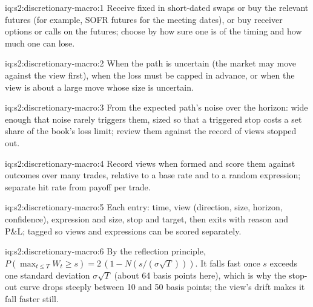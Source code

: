 \begin{solution}{iq:s2:discretionary-macro:1}
Receive fixed in short-dated swaps or buy the relevant futures (for example, SOFR futures for the meeting dates), or buy receiver options or calls on
the futures; choose by how sure one is of the timing and how much one can lose.
\end{solution}

\begin{solution}{iq:s2:discretionary-macro:2}
When the path is uncertain (the market may move against the view first), when the loss must be capped in advance, or when the view is about a large
move whose size is uncertain.
\end{solution}

\begin{solution}{iq:s2:discretionary-macro:3}
From the expected path's noise over the horizon: wide enough that noise rarely triggers them, sized so that a triggered stop costs a set share of the
book's loss limit; review them against the record of views stopped out.
\end{solution}

\begin{solution}{iq:s2:discretionary-macro:4}
Record views when formed and score them against outcomes over many trades, relative to a base rate and to a random expression; separate hit rate from
payoff per trade.
\end{solution}

\begin{solution}{iq:s2:discretionary-macro:5}
Each entry: time, view (direction, size, horizon, confidence), expression and size, stop and target, then exits with reason and P\&L; tagged so views
and expressions can be scored separately.
\end{solution}

\begin{solution}{iq:s2:discretionary-macro:6}
By the reflection principle, $P(\max_{t \le T} W_t \ge s) = 2\,(1 - N(s/(\sigma\sqrt T)))$. It falls fast once $s$ exceeds one standard deviation
$\sigma\sqrt T$ (about 64 basis points here), which is why the stop-out curve drops steeply between 10 and 50 basis points; the view's drift makes it
fall faster still.
\end{solution}
